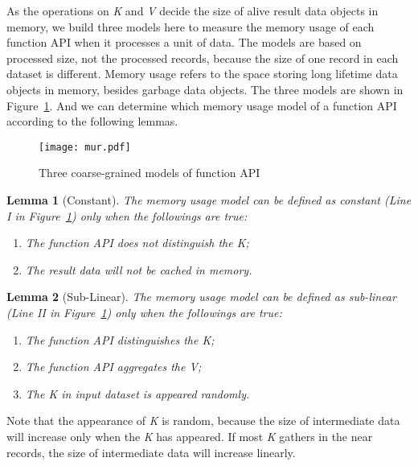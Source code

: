 As the operations on \textit{K} and \textit{V} decide the size of alive result data objects in memory, we build three models here to measure the memory usage of each function API when it processes a unit of data. The models are based on processed size, not the processed records, because the size of one record in each dataset is different. Memory usage refers to the space storing long lifetime data objects in memory, besides garbage data objects. The three models are shown in Figure~\ref{fig:mur}. And we can determine which memory usage model of a function API according to the following lemmas.

\begin{figure}[!t]
\centering
\texttt{[image: mur.pdf]}
\caption{Three coarse-grained models of function API}
\label{fig:mur}
\end{figure}

\newtheorem{lemma}{Lemma}
\begin{lemma}[Constant] The memory usage model can be defined as constant (Line I in Figure~\ref{fig:mur}) only when the followings are true:
\begin{enumerate}
\item The function API does not distinguish the \textit{K};
\item The result data will not be cached in memory.
\end{enumerate}
\end{lemma}

\begin{lemma}[Sub-Linear] The memory usage model can be defined as sub-linear (Line II in Figure~\ref{fig:mur}) only when the followings are true:
\begin{enumerate}
\item The function API distinguishes the \textit{K};
\item The function API aggregates the \textit{V};
\item The \textit{K} in input dataset is appeared randomly.
\end{enumerate}
\end{lemma}

Note that the appearance of \textit{K} is random, because the size of intermediate data will increase only when the \textit{K} has appeared. If most \textit{K} gathers in the near records, the size of intermediate data will increase linearly.

